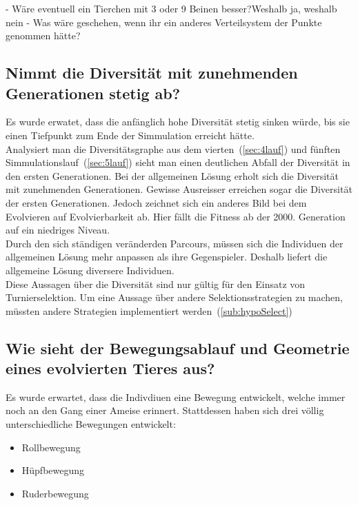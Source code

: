 
      - Wäre eventuell ein Tierchen mit 3 oder 9 Beinen besser?Weshalb ja, weshalb nein
      - Was wäre geschehen, wenn ihr ein anderes Verteilsystem der Punkte genommen hätte?

    \subsection{Nimmt die Diversität mit zunehmenden Generationen stetig ab?}
      Es wurde erwatet, dass die anfänglich hohe Diversität stetig sinken würde,
      bis sie einen Tiefpunkt zum Ende der Simmulation erreicht hätte.
      \\
      Analysiert man die Diversitätsgraphe aus dem vierten~(\vref{sec:4lauf}) und
      fünften Simmulationslauf~(\vref{sec:5lauf}) sieht man einen deutlichen Abfall der Diversität in den ersten Generationen.
      Bei der allgemeinen Lösung erholt sich die Diversität mit zunehmenden Generationen.
      Gewisse Ausreisser erreichen sogar die Diversität der ersten Generationen.
      Jedoch zeichnet sich ein anderes Bild bei dem Evolvieren auf Evolvierbarkeit ab.
      Hier fällt die Fitness ab der 2000. Generation auf ein niedriges Niveau.
      \\
      Durch den sich ständigen veränderden Parcours,
      müssen sich die Individuen der allgemeinen Lösung mehr anpassen als ihre Gegenspieler.
      Deshalb liefert die allgemeine Lösung diversere Individuen.
      \\
      Diese Aussagen über die Diversität sind nur gültig für den Einsatz von Turnierselektion.
      Um eine Aussage über andere Selektionsstrategien zu machen,
      müssten andere Strategien implementiert werden~(\vref{sub:hypoSelect})

    \subsection{Wie sieht der Bewegungsablauf und Geometrie eines evolvierten Tieres aus?}

      Es wurde erwartet, dass die Indivdiuen eine Bewegung entwickelt, welche immer noch an den Gang einer Ameise erinnert.
      Stattdessen haben sich drei völlig unterschiedliche Bewegungen entwickelt:

      \begin{itemize}
        \item Rollbewegung
        \item Hüpfbewegung
        \item Ruderbewegung
      \end{itemize}

